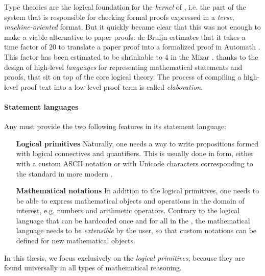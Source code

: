 Type theories are the logical foundation for the \emph{kernel} of , i.e. the part of the system that is responsible for checking formal
proofs expressed in a \emph{terse}, \emph{machine-oriented} format. But it
quickly became clear that this was not enough to make  a viable
alternative to paper proofs: de Bruijn estimates that it takes a time factor of
20 to translate a paper proof into a formalized proof in Automath
. This factor has been estimated to
be shrinkable to 4 in the Mizar  ,
thanks to the design of high-level \emph{languages} for representing
mathematical statements and proofs, that sit on top of the core logical
theory. The
process of compiling a high-level proof text into a low-level proof term is
called \emph{elaboration}.

\paragraph{Statement languages}

Any  must provide the two following features in its statement
language:

\begin{itemize}
  \item[\textbf{Logical primitives}] Naturally, one needs a way to write
  propositions formed with logical connectives and quantifiers. This is usually
  done in  form, either with a custom ASCII notation or with Unicode
  characters corresponding to the standard  in more modern . 
  \item[\textbf{Mathematical notations}] In addition to the logical primitives,
  one needs to be able to express mathematical objects and operations in the
  domain of interest, e.g. numbers and arithmetic operators. Contrary to the
  logical language that can be hardcoded once and for all in the , the mathematical language needs to be \emph{extensible} by the
  user, so that custom notations can be defined for new mathematical objects.
\end{itemize}

\begin{emphpar}
  In this thesis, we focus exclusively on the \emph{logical primitives}, because
  they are found universally in all types of mathematical reasoning. 
\end{emphpar}

